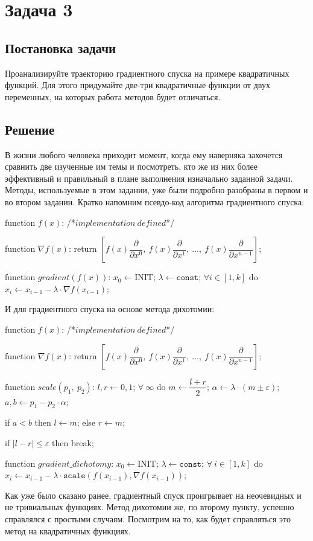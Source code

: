 \documentclass[12pt, a4paper, oneside, final]{article}
\begin{document}
	\section*{Задача 3}
	\subsection*{Постановка задачи}
	Проанализируйте траекторию градиентного спуска на примере квадратичных функций. Для этого придумайте две-три квадратичные функции от двух переменных, на которых работа методов будет отличаться.
	\subsection*{Решение}
	В жизни любого человека приходит момент, когда ему наверняка захочется сравнить две изученные им темы и посмотреть, кто же из них более эффективный и правильный в плане выполнения изначально заданной задачи. Методы, используемые в этом задании, уже были подробно разобраны в первом и во втором задании. Кратко напомним псевдо-код алгоритма градиентного спуска:
	\begin{pseudocode}
function $f(x)$:
	/*$implementation~defined$*/

function $\nabla{f(x)}$:
	return $\left[f(x)\dfrac{\partial}{\partial{x^{0}}}, ~ f(x)\dfrac{\partial}{\partial{x^{1}}}, ~ \ldots, ~ f(x)\dfrac{\partial}{\partial{x^{n - 1}}}\right]$;
	
function $gradient(f(x))$:
	$x_{0} \gets \text{INIT}$;
	$\lambda \gets \texttt{const}$;
	$\forall i \in [1, k]$ do
		$x_{i} \gets x_{i - 1} - \lambda \cdot \nabla{f(x_{i - 1})}$;
	\end{pseudocode}
	И для градиентного спуска на основе метода дихотомии:
	\begin{pseudocode}
function $f(x)$:
	/*$implementation~defined$*/

function $\nabla{f(x)}$:
	return $\left[f(x)\dfrac{\partial}{\partial{x^{0}}}, ~ f(x)\dfrac{\partial}{\partial{x^{1}}}, ~ \ldots, ~ f(x)\dfrac{\partial}{\partial{x^{n - 1}}}\right]$;
	
function $scale(p_1, ~ p_2)$:
	$l, r \gets 0, 1$;
	$\forall~\infty$ do
		$m \gets \dfrac{l + r}{2}$;
		$\alpha \gets \lambda \cdot (m \pm \varepsilon)$;
		$a, b \gets p_1 - p_2 \cdot \alpha$;
	
		if $a < b$ then
			$l \gets m$;
		else
			$r \gets m$;

		if $|l - r| \leqslant \varepsilon$ then
			break;

function $gradient\_dichotomy$:
	$x_{0} \gets \text{INIT}$;
	$\lambda \gets \texttt{const}$;
	$\forall~i \in [1, k]$ do
		$x_{i} \gets x_{i - 1} - \lambda \cdot \texttt{scale}(f(x_{i - 1}), \nabla{f(x_{i - 1})})$;
	\end{pseudocode}
	Как уже было сказано ранее, градиентный спуск проигрывает на неочевидных и не тривиальных функциях. Метод дихотомии же, по второму пункту, успешно справлялся с простыми случаям. Посмотрим на то, как будет справляться это метод на квадратичных функциях.
\end{document}
